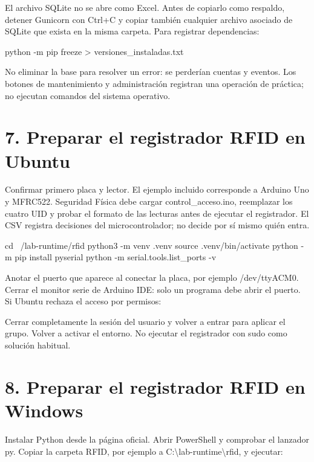 \documentclass[12pt,a4paper]{article}
\begin{document}
El archivo SQLite no se abre como Excel. Antes de copiarlo como respaldo, detener Gunicorn con Ctrl+C y copiar también cualquier archivo asociado de SQLite que exista en la misma carpeta. Para registrar dependencias:\par
{}
\begin{Comandos}
python -m pip freeze > versiones_instaladas.txt
\end{Comandos}
No eliminar la base para resolver un error: se perderían cuentas y eventos. Los botones de mantenimiento y administración registran una operación de práctica; no ejecutan comandos del sistema operativo.\par
{}\section*{7. Preparar el registrador RFID en Ubuntu}
Confirmar primero placa y lector. El ejemplo incluido corresponde a Arduino Uno y MFRC522. Seguridad Física debe cargar \textnormal{control\_\allowbreak{}acceso.ino}, reemplazar los cuatro UID y probar el formato de las lecturas antes de ejecutar el registrador. El CSV registra decisiones del microcontrolador; no decide por sí mismo quién entra.\par
{}
\begin{Comandos}
cd ~/lab-runtime/rfid
python3 -m venv .venv
source .venv/bin/activate
python -m pip install pyserial
python -m serial.tools.list_ports -v
\end{Comandos}
Anotar el puerto que aparece al conectar la placa, por ejemplo \textnormal{/\allowbreak{}dev/\allowbreak{}ttyACM0}. Cerrar el monitor serie de Arduino IDE: solo un programa debe abrir el puerto. Si Ubuntu rechaza el acceso por permisos:\par
{}
Cerrar completamente la sesión del usuario y volver a entrar para aplicar el grupo. Volver a activar el entorno. No ejecutar el registrador con \textnormal{sudo} como solución habitual.\par
{}\section*{8. Preparar el registrador RFID en Windows}
Instalar Python desde la página oficial. Abrir PowerShell y comprobar el lanzador \textnormal{py}. Copiar la carpeta RFID, por ejemplo a \textnormal{C:\textbackslash{}lab-runtime\textbackslash{}rfid}, y ejecutar:\par
\end{document}
